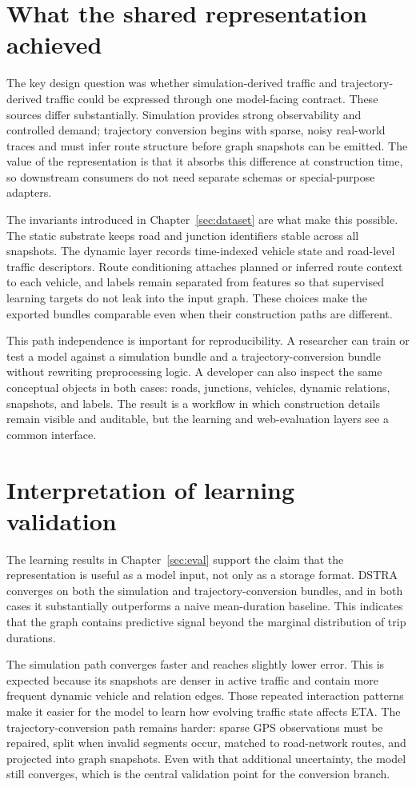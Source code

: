 \section{What the shared representation achieved}
The key design question was whether simulation-derived traffic and trajectory-derived traffic could be expressed through one model-facing contract. These sources differ substantially. Simulation provides strong observability and controlled demand; trajectory conversion begins with sparse, noisy real-world traces and must infer route structure before graph snapshots can be emitted. The value of the representation is that it absorbs this difference at construction time, so downstream consumers do not need separate schemas or special-purpose adapters.

The invariants introduced in Chapter~\ref{sec:dataset} are what make this possible. The static substrate keeps road and junction identifiers stable across all snapshots. The dynamic layer records time-indexed vehicle state and road-level traffic descriptors. Route conditioning attaches planned or inferred route context to each vehicle, and labels remain separated from features so that supervised learning targets do not leak into the input graph. These choices make the exported bundles comparable even when their construction paths are different.

This path independence is important for reproducibility. A researcher can train or test a model against a simulation bundle and a trajectory-conversion bundle without rewriting preprocessing logic. A developer can also inspect the same conceptual objects in both cases: roads, junctions, vehicles, dynamic relations, snapshots, and labels. The result is a workflow in which construction details remain visible and auditable, but the learning and web-evaluation layers see a common interface.

\section{Interpretation of learning validation}
The learning results in Chapter~\ref{sec:eval} support the claim that the representation is useful as a model input, not only as a storage format. DSTRA converges on both the simulation and trajectory-conversion bundles, and in both cases it substantially outperforms a naive mean-duration baseline. This indicates that the graph contains predictive signal beyond the marginal distribution of trip durations.

The simulation path converges faster and reaches slightly lower error. This is expected because its snapshots are denser in active traffic and contain more frequent dynamic vehicle and relation edges. Those repeated interaction patterns make it easier for the model to learn how evolving traffic state affects ETA. The trajectory-conversion path remains harder: sparse GPS observations must be repaired, split when invalid segments occur, matched to road-network routes, and projected into graph snapshots. Even with that additional uncertainty, the model still converges, which is the central validation point for the conversion branch.

